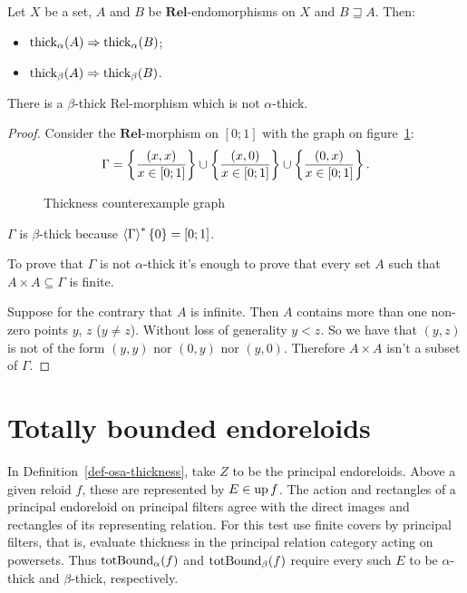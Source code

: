 \begin{obvious}
Let $X$ be a set, $A$ and $B$ be $\mathbf{Rel}$-endomorphisms
on $X$ and $B\sqsupseteq A$. Then:
\begin{itemize}
\item $\operatorname{thick}_{\alpha}(A)\Rightarrow\operatorname{thick}_{\alpha}(B)$;
\item $\operatorname{thick}_{\beta}(A)\Rightarrow\operatorname{thick}_{\beta}(B)$.
\end{itemize}
\end{obvious}
\begin{example}
There is a $\beta$-thick Rel-morphism which is not $\alpha$-thick.\end{example}
\begin{proof}
Consider the $\mathbf{Rel}$-morphism on $[0;1]$ with the graph on
figure~\ref{fig:thick-counterexample}:
\[
\Gamma=\left\{ \frac{(x,x)}{x\in[0;1]}\right\}\cup\left\{ \frac{(x,0)}{x\in[0;1]}\right\}\cup\left\{ \frac{(0,x)}{x\in[0;1]}\right\}.
\]
\begin{figure}[ht]

\caption{\label{fig:thick-counterexample}Thickness counterexample graph}
\end{figure}


$\Gamma$ is $\beta$-thick because $\left\langle \Gamma\right\rangle ^{\ast}\{0\}=[0;1]$.

To prove that $\Gamma$ is not $\alpha$-thick it's enough to prove
that every set $A$ such that $A\times A\subseteq\Gamma$ is finite.

Suppose for the contrary that $A$ is infinite. Then $A$ contains
more than one non-zero points $y$, $z$ ($y\ne z$). Without loss
of generality $y<z$. So we have that $(y,z)$ is not of the form
$(y,y)$ nor $(0,y)$ nor $(y,0)$. Therefore $A\times A$ isn't a
subset of $\Gamma$.
\end{proof}

\section{Totally bounded endoreloids}

In Definition~\ref{def-osa-thickness}, take $Z$ to be the
principal endoreloids. Above a given reloid $f$, these are represented
by $E\in\operatorname{up} f$. The action and rectangles of a principal
endoreloid on principal filters agree with the direct images and
rectangles of its representing relation. For this test use finite
covers by principal filters, that is, evaluate thickness in the
principal relation category acting on powersets. Thus
$\operatorname{totBound}_\alpha(f)$ and $\operatorname{totBound}_\beta(f)$ require every such
$E$ to be $\alpha$-thick and $\beta$-thick, respectively.

